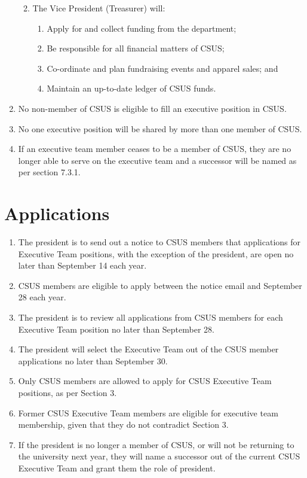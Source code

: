 \documentclass{article}
\begin{document}
\begin{enumerate}
\begin{enumerate}
\begin{enumerate}
		\end{enumerate}
		\item The Vice President (Treasurer) will:
		\begin{enumerate}
			\item Apply for and collect funding from the department;
			\item Be responsible for all financial matters of CSUS;
			\item Co-ordinate and plan fundraising events and apparel sales; and
			\item Maintain an up-to-date ledger of CSUS funds.
		\end{enumerate}
	\end{enumerate}
	\item No non-member of CSUS is eligible to fill an executive position in CSUS.
	\item No one executive position will be shared by more than one member of CSUS.
	\item If an executive team member ceases to be a member of CSUS, they are no longer able to serve on the executive team and a successor will be named as per section 7.3.1.
\end{enumerate}

\section{Applications}
\begin{enumerate}
	\item The president is to send out a notice to CSUS members that applications for Executive Team positions, with the exception of the president, are open no later than September 14 each year.
	\item CSUS members are eligible to apply between the notice email and September 28 each year.
	\item The president is to review all applications from CSUS members for each Executive Team position no later than September 28.
	\item The president will select the Executive Team out of the CSUS member applications no later than September 30.
	\item Only CSUS members are allowed to apply for CSUS Executive Team positions, as per Section 3.
	\item Former CSUS Executive Team members are eligible for executive team membership, given that they do not contradict Section 3.
	\item If the president is no longer a member of CSUS, or will not be returning to the university next year, they will name a successor out of the current CSUS Executive Team and grant them the role of president.
\end{enumerate}
\end{document}
